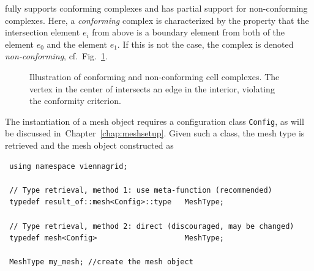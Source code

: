 {\ViennaGrid} fully supports conforming complexes and has partial support for non-conforming complexes.
Here, a \emph{conforming} complex is characterized by the property that the intersection element $e_i$  from above is a boundary element from both of the element $e_0$ and the element $e_1$.
If this is not the case, the complex is denoted \emph{non-conforming}, cf.~Fig.~\ref{fig:conformity}.

\begin{figure}[tb]
\centering
    \hspace*{2cm}
 \caption{Illustration of conforming and non-conforming cell complexes. The vertex in the center of  intersects an edge in the interior, violating the conformity criterion.}
 \label{fig:conformity}
\end{figure}

\pagebreak

The instantiation of a {\ViennaGrid} mesh object requires a configuration class \lstinline|Config|, as will be discussed in~Chapter~\ref{chap:meshsetup}.
Given such a class, the mesh type is retrieved and the mesh object constructed as
\begin{lstlisting}
 using namespace viennagrid;

 // Type retrieval, method 1: use meta-function (recommended)
 typedef result_of::mesh<Config>::type   MeshType;

 // Type retrieval, method 2: direct (discouraged, may be changed)
 typedef mesh<Config>                    MeshType;

 MeshType my_mesh; //create the mesh object
\end{lstlisting}

